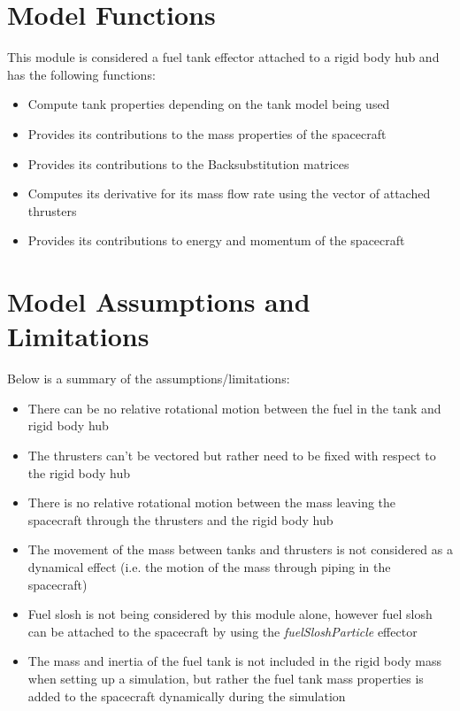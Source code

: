 \section{Model Functions}

This module is considered a fuel tank effector attached to a rigid body hub and has the following functions:

\begin{itemize}
	\item Compute tank properties depending on the tank model being used
	\item Provides its contributions to the mass properties of the spacecraft
	\item Provides its contributions to the Backsubstitution matrices
	\item Computes its derivative for its mass flow rate using the vector of attached thrusters
	\item Provides its contributions to energy and momentum of the spacecraft
\end{itemize}

\section{Model Assumptions and Limitations}
Below is a summary of the assumptions/limitations:

\begin{itemize}
	\item There can be no relative rotational motion between the fuel in the tank and rigid body hub
	\item The thrusters can't be vectored but rather need to be fixed with respect to the rigid body hub
	\item There is no relative rotational motion between the mass leaving the spacecraft through the thrusters and the rigid body hub
	\item The movement of the mass between tanks and thrusters is not considered as a dynamical effect (i.e. the motion of the mass through piping in the spacecraft)
	\item Fuel slosh is not being considered by this module alone, however fuel slosh can be attached to the spacecraft by using the \textit{fuelSloshParticle} effector
	\item The mass and inertia of the fuel tank is not included in the rigid body mass when setting up a simulation, but rather the fuel tank mass properties is added to the spacecraft dynamically during the simulation
\end{itemize}
